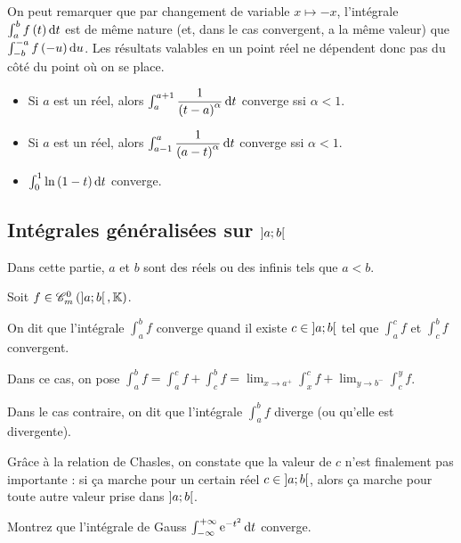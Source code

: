 On peut remarquer que par changement de variable \(x\mapsto-x\), l'intégrale \(\int_a^bf\paren{t}\odif{t}\) est de même nature (et, dans le cas convergent, a la même valeur) que \(\int_{-b}^{-a}f\paren{-u}\odif{u}\). Les résultats valables en un point réel ne dépendent donc pas du côté du point où on se place.

\begin{ex}
\begin{itemize}
    \item Si \(a\) est un réel, alors \(\int_a^{a+1}\dfrac{1}{\paren{t-a}^\alpha}\odif{t}\) converge ssi \(\alpha<1\). \\
    \item Si \(a\) est un réel, alors \(\int_{a-1}^a\dfrac{1}{\paren{a-t}^\alpha}\odif{t}\) converge ssi \(\alpha<1\). \\
    \item \(\int_0^1\ln\paren{1-t}\odif{t}\) converge.
\end{itemize}
\end{ex}

\subsection{Intégrales généralisées sur \(\left]a;b\right[\)}

Dans cette partie, \(a\) et \(b\) sont des réels ou des infinis tels que \(a<b\).

\begin{defi}
Soit \(f\in\contm[\intervee{a}{b}]\).

On dit que l'intégrale \(\int_a^bf\) converge quand il existe \(c\in\left]a;b\right[\) tel que \(\int_a^cf\) et \(\int_c^bf\) convergent.

Dans ce cas, on pose \(\int_a^bf=\int_a^cf+\int_c^bf=\lim_{x\to a^+}\int_x^cf+\lim_{y\to b^-}\int_c^yf\).

Dans le cas contraire, on dit que l'intégrale \(\int_a^bf\) diverge (ou qu'elle est divergente).
\end{defi}

\begin{rem}
Grâce à la relation de Chasles, on constate que la valeur de \(c\) n'est finalement pas importante : si ça marche pour un certain réel \(c\in\left]a;b\right[\), alors ça marche pour toute autre valeur prise dans \(\left]a;b\right[\).
\end{rem}

\begin{exo}
Montrez que l'intégrale de Gauss \(\int_{\minf}^{\pinf}\e{-t^2}\odif{t}\) converge.
\end{exo}

